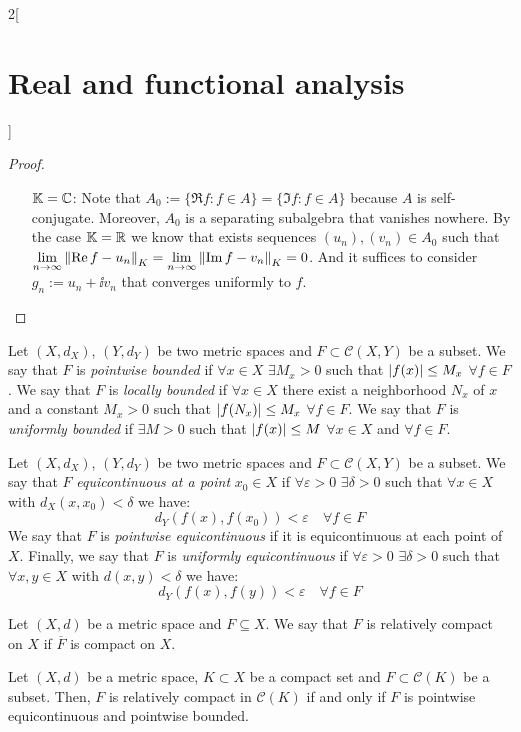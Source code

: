 \documentclass[../../../main_math.tex]{subfiles}
\begin{document}
\begin{multicols}{2}[\section{Real and functional analysis}]
\begin{proof}
\begin{itemize}[leftmargin=1.3cm]
      \item[$\mathbb{K}=\mathbb{C}$:] Note that $A_0:=\{\Re f:f\in A\}=\{\Im f:f\in A\}$ because $A$ is self-conjugate. Moreover, $A_0$ is a separating subalgebra that vanishes nowhere. By the case $\mathbb{K}=\mathbb{R}$ we know that exists sequences $(u_n),(v_n)\in A_0$ such that $\displaystyle\lim_{n\to\infty}\left\|\Re f-u_n\right\|_K=\lim_{n\to\infty}\left\|\Im f-v_n\right\|_K=0$. And it suffices to consider $g_n:=u_n+\ii v_n$ that converges uniformly to $f$.
    \end{itemize}
  \end{proof}
  \begin{definition}
    Let $(X,d_X)$, $(Y,d_Y)$ be two metric spaces and $F\subset\mathcal{C}(X,Y)$ be a subset.
    We say that $F$ is \emph{pointwise bounded} if $\forall x\in X$ $\exists M_x>0$ such that $\abs{f(x)}\leq M_x$ $\forall f\in F$.
    We say that $F$ is \emph{locally bounded} if $\forall x\in X$ there exist a neighborhood $N_x$ of $x$ and a constant $M_x>0$ such that $\abs{f(N_x)}\leq M_x$ $\forall f\in F$.
    We say that $F$ is \emph{uniformly bounded} if $\exists M>0$ such that $\abs{f(x)}\leq M$ $\forall x\in X$ and $\forall f\in F$.
  \end{definition}
  \begin{definition}
    Let $(X,d_X)$, $(Y,d_Y)$ be two metric spaces and $F\subset\mathcal{C}(X,Y)$ be a subset. We say that $F$ \emph{equicontinuous at a point} $x_0\in X$ if $\forall \varepsilon>0$ $\exists \delta>0$ such that $\forall x\in X$ with $d_X(x,x_0)<\delta$ we have: $$d_Y(f(x),f(x_0))<\varepsilon\quad\forall f\in F$$
    We say that $F$ is \emph{pointwise equicontinuous} if it is equicontinuous at each point of $X$. Finally, we say that $F$ is \emph{uniformly equicontinuous} if $\forall \varepsilon>0$ $\exists \delta>0$ such that $\forall x,y\in X$ with $d(x,y)<\delta$ we have: $$d_Y(f(x),f(y))<\varepsilon\quad\forall f\in F$$
  \end{definition}
  \begin{definition}
    Let $(X,d)$ be a metric space and $F\subseteq X$. We say that $F$ is relatively compact on $X$ if $\overline{F}$ is compact on $X$.
  \end{definition}
  \begin{important}
    \begin{theorem}\label{RFA:arzela}
      Let $(X,d)$ be a metric space, $K\subset X$ be a compact set and $F\subset \mathcal{C}(K)$ be a subset. Then, $F$ is relatively compact in $\mathcal{C}(K)$ if and only if $F$ is pointwise equicontinuous and pointwise bounded.
    \end{theorem}
  \end{important}


\end{multicols}
\end{document}
